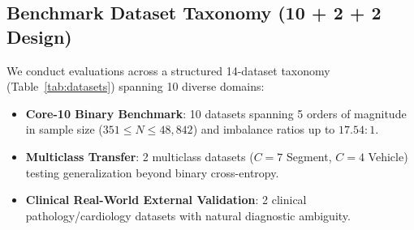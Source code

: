 \documentclass[preprint,12pt]{elsarticle}
\begin{document}
\subsection{Benchmark Dataset Taxonomy (10 + 2 + 2 Design)}
We conduct evaluations across a structured 14-dataset taxonomy (Table~\ref{tab:datasets}) spanning 10 diverse domains:
\begin{itemize}
    \item \textbf{Core-10 Binary Benchmark}: 10 datasets spanning 5 orders of magnitude in sample size ($351 \le N \le 48,842$) and imbalance ratios up to $17.54:1$.
    \item \textbf{Multiclass Transfer}: 2 multiclass datasets ($C=7$ Segment, $C=4$ Vehicle) testing generalization beyond binary cross-entropy.
    \item \textbf{Clinical Real-World External Validation}: 2 clinical pathology/cardiology datasets with natural diagnostic ambiguity.
\end{itemize}
\end{document}
